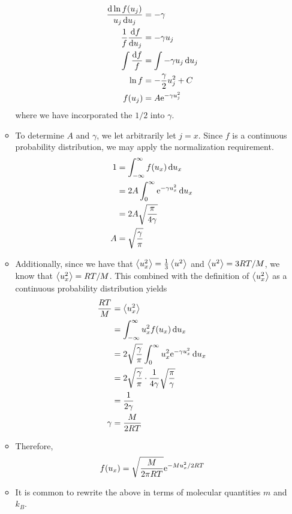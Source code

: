 \documentclass[../notes.tex]{subfiles}
\begin{document}
\begin{itemize}
\begin{itemize}
        \begin{align*}
            \frac{\dd{\ln f(u_j)}}{u_j\dd{u_j}} &= -\gamma\\
            \frac{1}{f}\dv{f}{u_j} &= -\gamma u_j\\
            \int\frac{\dd{f}}{f} &= \int-\gamma u_j\dd{u_j}\\
            \ln f &= -\frac{\gamma}{2}u_j^2+C\\
            f(u_j) &= A\e[-\gamma u_j^2]
        \end{align*}
        where we have incorporated the $1/2$ into $\gamma$.
        \item To determine $A$ and $\gamma$, we let arbitrarily let $j=x$. Since $f$ is a continuous probability distribution, we may apply the normalization requirement.
        \begin{align*}
            1 &= \int_{-\infty}^\infty f(u_x)\dd{u_x}\\
            &= 2A\int_0^\infty\e[-\gamma u_x^2]\dd{u_x}\\
            &= 2A\sqrt{\frac{\pi}{4\gamma}}\\
            A &= \sqrt{\frac{\gamma}{\pi}}
        \end{align*}
        \item Additionally, since we have that $\prb{u_x^2}=\frac{1}{3}\prb{u^2}$ and $\prb{u^2}=3RT/M$, we know that $\prb{u_x^2}=RT/M$. This combined with the definition of $\prb{u_x^2}$ as a continuous probability distribution yields
        \begin{align*}
            \frac{RT}{M} &= \prb{u_x^2}\\
            &= \int_{-\infty}^\infty u_x^2f(u_x)\dd{u_x}\\
            &= 2\sqrt{\frac{\gamma}{\pi}}\int_0^\infty u_x^2\e[-\gamma u_x^2]\dd{u_x}\\
            &= 2\sqrt{\frac{\gamma}{\pi}}\cdot\frac{1}{4\gamma}\sqrt{\frac{\pi}{\gamma}}\\
            &= \frac{1}{2\gamma}\\
            \gamma &= \frac{M}{2RT}
        \end{align*}
        \item Therefore,
        \begin{equation*}
            f(u_x) = \sqrt{\frac{M}{2\pi RT}}\e[-Mu_x^2/2RT]
        \end{equation*}
        \item It is common to rewrite the above in terms of molecular quantities $m$ and $k_B$.

\end{itemize}
\end{itemize}
\end{document}
